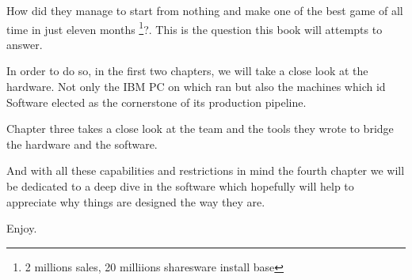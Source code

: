 \par
 How did they manage to start from nothing and make one of the best game of all time in just eleven months \footnote{2 millions sales, 20 milliions sharesware install base}?. This is the question this book will attempts to answer.\\
 \par
  In order to do so, in the first two chapters, we will take a close look at the hardware. Not only the IBM PC on which \doom ran but also the \NeXT machines which id Software elected as the cornerstone of its production pipeline.\\
  \par 
  Chapter three takes a close look at the team and the tools they wrote to bridge the hardware and the software.\\
  \par
  And with all these capabilities and restrictions in mind the fourth chapter we will be dedicated to a deep dive in the software which hopefully will help to appreciate why things are designed the way they are.\\
\par
Enjoy.

\begin{figure}[H]
\centering
{}
\end{figure}
\par
\vspace{15pt}
\par
\begin{figure}[H]
\centering
{}
\end{figure}
